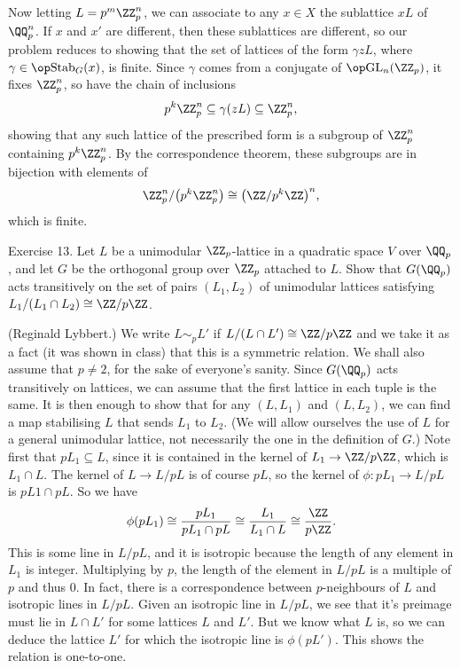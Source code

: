 Now letting $L = p^m \ZZ_p^n$, we can associate to any $x\in X$ the sublattice $xL$
of $\QQ_p^n$. If $x$ and $x'$ are different,
then these sublattices are different, so our problem reduces to showing that the set of lattices of the
form
$\gamma zL$, where $\gamma\in \Stab_G(x)$, is finite. Since $\gamma$ comes from a conjugate of $\GL_n(\ZZ_p)$,
it fixes $\ZZ_p^n$, so have the chain of inclusions
$$p^{k}\ZZ_p^n \subseteq \gamma (zL) \subseteq \ZZ_p^n,$$
showing that
any such lattice of the prescribed form
is a subgroup of $\ZZ_p^n$ containing $p^{k}\ZZ_p^n$. By the correspondence theorem,
these subgroups are in bijection with elements of
$$ \ZZ_p^n/\bigl(p^{k}\ZZ_p^n\bigr) \cong \bigl(\ZZ/p^{k}\ZZ\bigr)^n,$$
which is finite.
\slug

\nineproclaim Exercise 13. Let $L$ be a unimodular $\ZZ_p$-lattice in a quadratic space $V$ over $\QQ_p$,
and let $G$ be the orthogonal group over $\ZZ_p$ attached to $L$. Show that $G(\QQ_p)$ acts
transitively on the set of pairs $(L_1,L_2)$ of unimodular lattices satisfying $L_1/(L_1\cap L_2)\cong
\ZZ/p\ZZ$.

\nineproof (Reginald Lybbert.)
We write $L\sim_p L'$ if $L/(L\cap L') \cong \ZZ/p\ZZ$ and we take it as a fact (it was shown
in class) that this is a symmetric relation. We shall also assume that $p\ne 2$, for the sake of everyone's
sanity.
Since $G(\QQ_p)$ acts transitively on lattices, we can assume that the first lattice in each tuple is
the same.
It is then enough to show that for any $(L,L_1)$ and $(L,L_2)$, we can find a map stabilising $L$ that sends
$L_1$ to $L_2$. (We will allow ourselves the use of $L$ for a general unimodular
lattice, not necessarily the one in the definition of $G$.) Note first that $pL_1\subseteq L$, since it
is contained in the kernel of $L_1\to \ZZ/p\ZZ$, which is $L_1\cap L$. The kernel of $L\to L/pL$ is of
course $pL$, so the kernel of $\phi: pL_1\to L/pL$ is $pL1\cap pL$. So we have
$$\phi(pL_1)\cong {pL_1\over pL_1\cap pL} \cong {L_1\over L_1\cap L} \cong {\ZZ\over p\ZZ}.$$
This is some line in $L/pL$, and it is isotropic because the length of any element in $L_1$ is integer.
Multiplying by $p$, the length of the element in $L/pL$ is a multiple of $p$ and thus $0$. In fact, there
is a correspondence between $p$-neighbours of $L$ and isotropic lines in $L/pL$. Given an isotropic line
in $L/pL$, we see that it's preimage must lie in $L\cap L'$ for some lattices $L$ and $L'$. But we know
what $L$ is, so we can deduce the lattice $L'$ for which the isotropic line is $\phi(pL')$. This shows
the relation is one-to-one.

